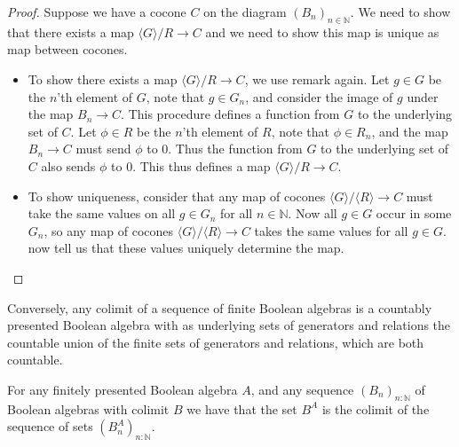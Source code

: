 \begin{proof}
  Suppose we have a cocone $C$ on the diagram $(B_n)_{n\in\mathbb N}$. 
  We need to show that there exists a map $\langle G \rangle / R\to C$ and
  we need to show this map is unique as map between cocones. 
  \begin{itemize}
    \item To show there exists a map $\langle G \rangle / R \to C$, 
      we use remark  again. 
      Let $g\in G$ be the $n$'th element of $G$, 
      note that $g\in G_n$, and consider the image of $g$ under the map $B_n \to C$. 
      This procedure defines a function from $G$ to the underlying set of $C$. 
      Let $\phi \in R$ be the $n$'th element of $R$, 
      note that $\phi \in R_n$, and the map $B_n \to C$ must send $\phi$ to $0$. 
      Thus the function from $G$ to the underlying set of $C$ also sends $\phi$ to $0$. 
      This thus defines a map $\langle G \rangle / R \to C$. 
    \item To show uniqueness, consider that any map of cocones $\langle G \rangle / \langle R \rangle \to C$ 
      must take the same values on all $g\in G_n$ for all $n\in\mathbb N$. 
      Now all $g\in G$ occur in some $G_n$, so any map of cocones $\langle G \rangle /  \langle R \rangle \to C$ 
      takes the same values for all $g\in G$. 
       now tell us that these values uniquely determine the map. 
  \end{itemize}
\end{proof}
\begin{remark}
  Conversely, any colimit of a sequence of finite Boolean algebras 
  is a countably presented Boolean algebra with 
  as underlying sets of generators and relations the countable union of the finite sets of 
  generators and relations, which are both countable. 
\end{remark}
\begin{lemma}\label{lemFinitelyPresentedBACompact}
  For any finitely presented Boolean algebra $A$,
  and any sequence $(B_n)_{n:\mathbb N}$ of Boolean algebras with colimit $B$
  we have that the set $B^A$ is the colimit of the sequence of sets $(B_n^A)_{n:\mathbb N}$. 
\end{lemma}  
